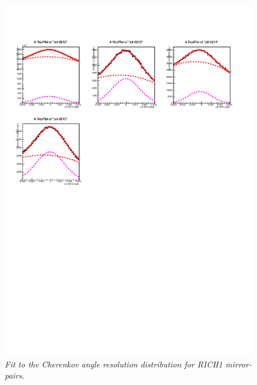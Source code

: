 \begin{figure}[!h]
	\vspace*{-0.cm}
	\begin{center}
		\includegraphics[width=1.\textwidth]{rich1_p2.pdf}
		\vspace*{-1.5cm}
	\end{center}
	\caption{\textit{Fit to the Cherenkov angle resolution distribution for RICH1 mirror-pairs.}}
	\label{fig:rich1p2}
\end{figure}
\clearpage
